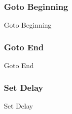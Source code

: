 \subsubsection{Goto Beginning}
\begin{usecase}{Goto Beginning}
    \precondition{
	    
    }
    \postconditions{
	    \item 
	    \item 
    }
    \mainsuccess{
	    \item 
    }
    \extensions{
	    \item[1.a]
		    \begin{enumerate}
			\item 
		    \end{enumerate}
    }
\end{usecase}
\newpage 
% 
\subsubsection{Goto End}
\begin{usecase}{Goto End} 

    \precondition{
	    
    }
    \postconditions{
	    \item 
	    \item 
    }
    \mainsuccess{
	    \item 
    }
    \extensions{
	    \item[1.a]
		    \begin{enumerate}
			\item 
		    \end{enumerate}
    }
\end{usecase}
\newpage 
% 
\subsubsection{Set Delay}
\begin{usecase}{Set Delay}
    \precondition{
	    
    }
    \postconditions{
	    \item 
	    \item 
    }
    \mainsuccess{
	    \item 
    }
    \extensions{
	    \item[1.a]
		    \begin{enumerate}
			\item 
		    \end{enumerate}
    }
\end{usecase}
\newpage 
% 
